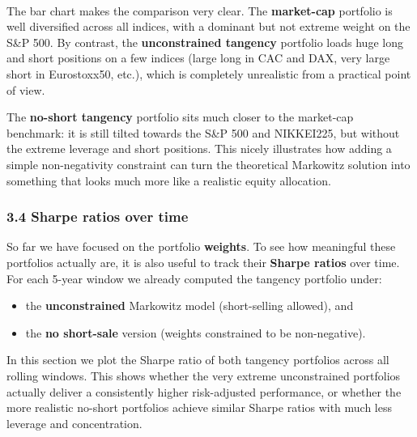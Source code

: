 \documentclass[11pt]{article}
\providecommand{\tightlist}{%
      \setlength{\itemsep}{0pt}\setlength{\parskip}{0pt}}
\begin{document}
    \begin{center}
    \end{center}
    { \hspace*{\fill} \\}
    
    The bar chart makes the comparison very clear. The \textbf{market-cap}
portfolio is well diversified across all indices, with a dominant but
not extreme weight on the S\&P 500. By contrast, the
\textbf{unconstrained tangency} portfolio loads huge long and short
positions on a few indices (large long in CAC and DAX, very large short
in Eurostoxx50, etc.), which is completely unrealistic from a practical
point of view.

The \textbf{no-short tangency} portfolio sits much closer to the
market-cap benchmark: it is still tilted towards the S\&P 500 and
NIKKEI225, but without the extreme leverage and short positions. This
nicely illustrates how adding a simple non-negativity constraint can
turn the theoretical Markowitz solution into something that looks much
more like a realistic equity allocation.

    \hypertarget{sharpe-ratios-over-time}{%
\subsubsection{3.4 Sharpe ratios over
time}\label{sharpe-ratios-over-time}}

So far we have focused on the portfolio \textbf{weights}. To see how
meaningful these portfolios actually are, it is also useful to track
their \textbf{Sharpe ratios} over time. For each 5-year window we
already computed the tangency portfolio under:

\begin{itemize}
\tightlist
\item
  the \textbf{unconstrained} Markowitz model (short-selling allowed),
  and\\
\item
  the \textbf{no short-sale} version (weights constrained to be
  non-negative).
\end{itemize}

In this section we plot the Sharpe ratio of both tangency portfolios
across all rolling windows. This shows whether the very extreme
unconstrained portfolios actually deliver a consistently higher
risk-adjusted performance, or whether the more realistic no-short
portfolios achieve similar Sharpe ratios with much less leverage and
concentration.
\end{document}
